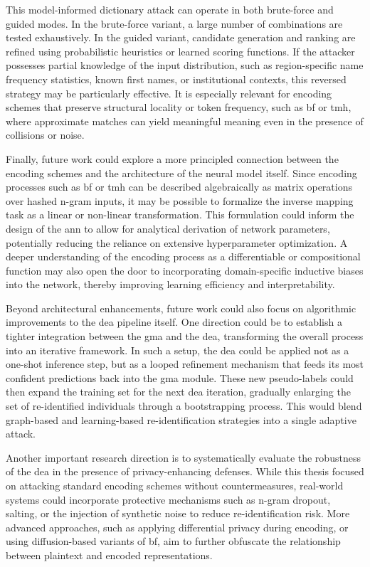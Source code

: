 This model-informed dictionary attack can operate in both brute-force and guided modes.
In the brute-force variant, a large number of combinations are tested exhaustively.
In the guided variant, candidate generation and ranking are refined using probabilistic heuristics or learned scoring functions.
If the attacker possesses partial knowledge of the input distribution, such as region-specific name frequency statistics, known first names, or institutional contexts, this reversed strategy may be particularly effective.
It is especially relevant for encoding schemes that preserve structural locality or token frequency, such as \ac{bf} or \ac{tmh}, where approximate matches can yield meaningful meaning even in the presence of collisions or noise.


Finally, future work could explore a more principled connection between the encoding schemes and the architecture of the neural model itself.
Since encoding processes such as \ac{bf} or \ac{tmh} can be described algebraically as matrix operations over hashed n-gram inputs, it may be possible to formalize the inverse mapping task as a linear or non-linear transformation.
This formulation could inform the design of the \ac{ann} to allow for analytical derivation of network parameters, potentially reducing the reliance on extensive hyperparameter optimization.
A deeper understanding of the encoding process as a differentiable or compositional function may also open the door to incorporating domain-specific inductive biases into the network, thereby improving learning efficiency and interpretability.

Beyond architectural enhancements, future work could also focus on algorithmic improvements to the \ac{dea} pipeline itself.
One direction could be to establish a tighter integration between the \ac{gma} and the \ac{dea}, transforming the overall process into an iterative framework.
In such a setup, the \ac{dea} could be applied not as a one-shot inference step, but as a looped refinement mechanism that feeds its most confident predictions back into the \ac{gma} module.
These new pseudo-labels could then expand the training set for the next \ac{dea} iteration, gradually enlarging the set of re-identified individuals through a bootstrapping process.
This would blend graph-based and learning-based re-identification strategies into a single adaptive attack.

Another important research direction is to systematically evaluate the robustness of the \ac{dea} in the presence of privacy-enhancing defenses.
While this thesis focused on attacking standard encoding schemes without countermeasures, real-world systems could incorporate protective mechanisms such as n-gram dropout, salting, or the injection of synthetic noise to reduce re-identification risk.
More advanced approaches, such as applying differential privacy during encoding, or using diffusion-based variants of \ac{bf}, aim to further obfuscate the relationship between plaintext and encoded representations.

